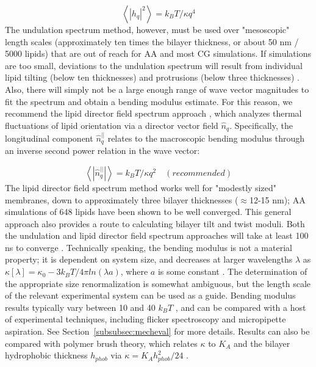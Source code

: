 \documentclass[9pt,bestpractices]{livecoms}
\begin{document}
\begin{equation}\label{eq:8}
	\left< \left|h_q \right|^2 \right> = k_BT/\kappa q^4
\end{equation}
The undulation spectrum method, however, must be used over "mesoscopic" length scales (approximately ten times the bilayer thickness, or about 50 nm / 5000 lipids) that are out of reach for AA and most CG simulations.
If simulations are too small, deviations to the undulation spectrum will result from individual lipid tilting (below ten thicknesses) and protrusions (below three thicknesses) \cite{Venable2015}.
Also, there will simply not be a large enough range of wave vector magnitudes to fit the spectrum and obtain a bending modulus estimate.
For this reason, we recommend the lipid director field spectrum approach \cite{Watson2012a,Venable2015}, which analyzes thermal fluctuations of lipid orientation via a director vector field $\hat{n}_q$.
Specifically, the longitudinal component $\hat{n}_q^{||}$ relates to the macroscopic bending modulus through an inverse second power relation in the wave vector:

\begin{equation}\label{eq:9}
	\left< \left|\hat{n}_q^{||} \right| \right> = k_BT/\kappa q^2 \quad (recommended)
\end{equation}
The lipid director field spectrum method works well for "modestly sized" membranes, down to approximately three bilayer thicknesses ($\approx$12-15 nm); AA simulations of 648 lipids have been shown to be well converged.
This general approach also provides a route to calculating bilayer tilt and twist moduli.
Both the undulation and lipid director field spectrum approaches will take at least 100 ns to converge \cite{Venable2015}.
Technically speaking, the bending modulus is not a material property; it is dependent on system size, and decreases at larger wavelengths $\lambda$ as $\kappa[\lambda] = \kappa _0 - 3k_BT/4\pi ln(\lambda a)$, where $a$ is some constant \cite{Peliti1985}.
The determination of the appropriate size renormalization is somewhat ambiguous, but the length scale of the relevant experimental system can be used as a guide.
Bending modulus results typically vary between 10 and 40 $k_BT$ \cite{Venable2015}, and can be compared with a host of experimental techniques, including flicker spectroscopy and micropipette aspiration.
See Section~\ref{subsubsec:mecheval} for more details.
Results can also be compared with polymer brush theory, which relates $\kappa$ to $K_A$ and the bilayer hydrophobic thickness $h_{phob}$ via $\kappa = K_Ah_{phob}^2/24$ \cite{Rawicz2000}.
\end{document}
